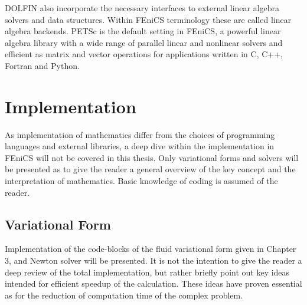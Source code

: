 DOLFIN also incorporate the necessary interfaces to external linear algebra solvers and data structures. Within FEniCS terminology these are called linear algebra backends. PETSc is the default setting in FEniCS, a powerful linear algebra library
with a wide range of parallel linear and nonlinear solvers and efficient as matrix and vector operations for applications written in C, C++, Fortran and Python.
\newpage

\section{Implementation}
As implementation of mathematics differ from the choices of programming languages and external libraries, a deep dive within the implementation in FEniCS will not be covered in this thesis. Only variational forms and solvers will be presented as to give the reader a general overview of the key concept and the interpretation of mathematics. Basic knowledge of coding is assumed of the reader. 

\subsection{Variational Form}
Implementation of the code-blocks of the fluid variational form given in Chapter 3, and Newton solver will be presented. It is not the intention to give the reader a deep review of the total implementation, but rather briefly point out key ideas intended for efficient speedup of the calculation. These ideas have proven essential as for the reduction of computation time of the complex problem.

